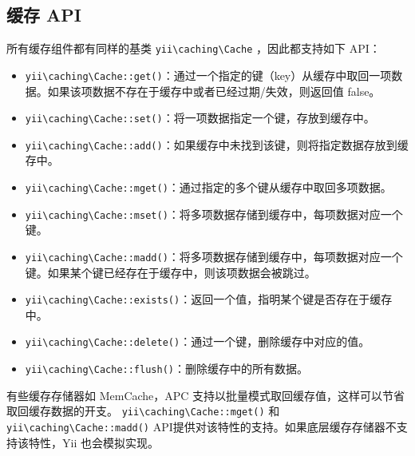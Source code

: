\subsection{缓存 API \label{caching-data.md::cache-apis}}
所有缓存组件都有同样的基类 \texttt{yii{\allowbreak{}\textbackslash}caching{\allowbreak{}\textbackslash}Cache} ，因此都支持如下 API：

\begin{itemize}
\item \texttt{yii{\allowbreak{}\textbackslash}caching{\allowbreak{}\textbackslash}Cache\allowbreak{}::\allowbreak{}get()}：通过一个指定的键（key）从缓存中取回一项数据。如果该项数据不存在于缓存中或者已经过期/失效，则返回值 false。
\item \texttt{yii{\allowbreak{}\textbackslash}caching{\allowbreak{}\textbackslash}Cache\allowbreak{}::\allowbreak{}set()}：将一项数据指定一个键，存放到缓存中。
\item \texttt{yii{\allowbreak{}\textbackslash}caching{\allowbreak{}\textbackslash}Cache\allowbreak{}::\allowbreak{}add()}：如果缓存中未找到该键，则将指定数据存放到缓存中。
\item \texttt{yii{\allowbreak{}\textbackslash}caching{\allowbreak{}\textbackslash}Cache\allowbreak{}::\allowbreak{}mget()}：通过指定的多个键从缓存中取回多项数据。
\item \texttt{yii{\allowbreak{}\textbackslash}caching{\allowbreak{}\textbackslash}Cache\allowbreak{}::\allowbreak{}mset()}：将多项数据存储到缓存中，每项数据对应一个键。
\item \texttt{yii{\allowbreak{}\textbackslash}caching{\allowbreak{}\textbackslash}Cache\allowbreak{}::\allowbreak{}madd()}：将多项数据存储到缓存中，每项数据对应一个键。如果某个键已经存在于缓存中，则该项数据会被跳过。
\item \texttt{yii{\allowbreak{}\textbackslash}caching{\allowbreak{}\textbackslash}Cache\allowbreak{}::\allowbreak{}exists()}：返回一个值，指明某个键是否存在于缓存中。
\item \texttt{yii{\allowbreak{}\textbackslash}caching{\allowbreak{}\textbackslash}Cache\allowbreak{}::\allowbreak{}delete()}：通过一个键，删除缓存中对应的值。
\item \texttt{yii{\allowbreak{}\textbackslash}caching{\allowbreak{}\textbackslash}Cache\allowbreak{}::\allowbreak{}flush()}：删除缓存中的所有数据。
\end{itemize}
有些缓存存储器如 MemCache，APC 支持以批量模式取回缓存值，这样可以节省取回缓存数据的开支。 \texttt{yii{\allowbreak{}\textbackslash}caching{\allowbreak{}\textbackslash}Cache\allowbreak{}::\allowbreak{}mget()} 和 \texttt{yii{\allowbreak{}\textbackslash}caching{\allowbreak{}\textbackslash}Cache\allowbreak{}::\allowbreak{}madd()} API提供对该特性的支持。如果底层缓存存储器不支持该特性，Yii 也会模拟实现。

